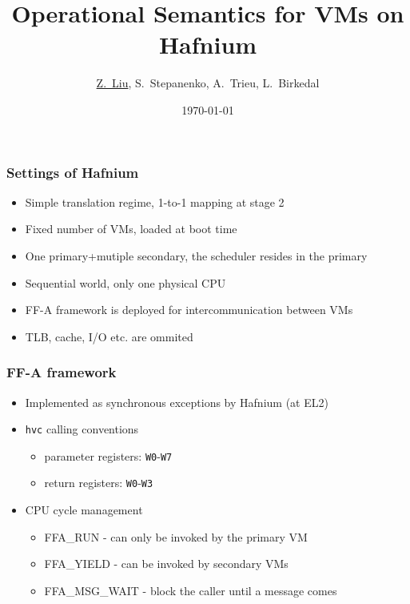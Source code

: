 \documentclass{beamer}
\title{Operational Semantics for VMs on Hafnium}
\institute{Aarhus University}
\date{\today}
\author[Liu, Stepanenko, Trieu, Birkedal]
{\underline{Z.~Liu}, S.~Stepanenko, A.~Trieu, L.~Birkedal}
\institute[Aarhus]
{
  Department of Computer Science\\
  Aarhus University
}
\begin{document}
\frame{\titlepage}

% 

\begin{frame}
  \frametitle{Settings of Hafnium}
  \begin{itemize}
    \item Simple translation regime, 1-to-1 mapping at stage 2
    \item Fixed number of VMs, loaded at boot time
    \item One primary+mutiple secondary, the scheduler resides in the primary
    \item Sequential world, only one physical CPU
    \item FF-A framework is deployed for intercommunication between VMs
    \item TLB, cache, I/O etc. are ommited
  \end{itemize}
\end{frame}

\begin{frame}
  \frametitle{FF-A framework}
  \begin{itemize}
    \item Implemented as synchronous exceptions by Hafnium (at EL2)
    \item \texttt{hvc} calling conventions
      \begin{itemize}
        \item parameter registers: \texttt{W0}-\texttt{W7}
          \item return registers: \texttt{W0}-\texttt{W3}
      \end{itemize}
    \item CPU cycle management
      \begin{itemize}
        \item FFA\_RUN - can only be invoked by the primary VM
        \item FFA\_YIELD - can be invoked by secondary VMs
        \item FFA\_MSG\_WAIT - block the caller until a message comes
      \end{itemize}

  \end{itemize}
\end{frame}
\end{document}
